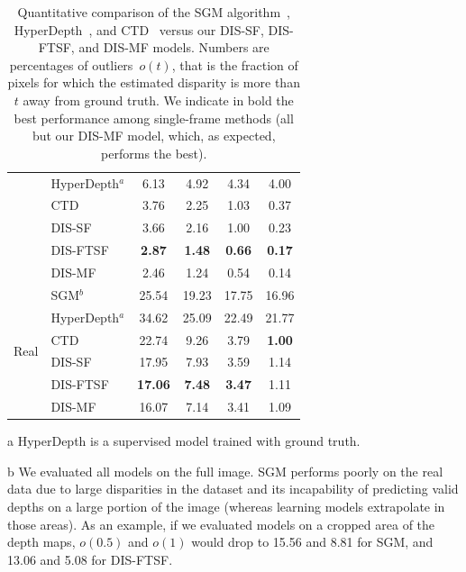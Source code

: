 \begin{table}[t]
\begin{center}
\begin{threeparttable}
\begin{tabular}{l|lcccc}
        & HyperDepth$^a$ & \phantom{0}6.13 & \phantom{0}4.92 & \phantom{0}4.34 & \phantom{0}4.00 \\
        & CTD & \phantom{0}3.76 & \phantom{0}2.25 & \phantom{0}1.03 & \phantom{0}0.37 \\
        & DIS-SF & \phantom{0}3.66 & \phantom{0}2.16 & \phantom{0}1.00 & \phantom{0}0.23 \\
        & DIS-FTSF & \phantom{0}\textbf{2.87} & \phantom{0}\textbf{1.48} & \phantom{0}\textbf{0.66} & \phantom{0}\textbf{0.17} \\ \arrayrulecolor{lightgray}\cline{2-6}\arrayrulecolor{black}
        & DIS-MF & \phantom{0}2.46 & \phantom{0}1.24 & \phantom{0}0.54 & \phantom{0}0.14 \\
        \hline
        \hline
        \multirow{6}{*}{\parbox{20ex}{Real}} & SGM$^b$ & 25.54 & 19.23 & 17.75 & 16.96 \\
        & HyperDepth$^a$ & 34.62 & 25.09 & 22.49 & 21.77 \\
        & CTD & 22.74 & \phantom{0}9.26 & \phantom{0}3.79 & \phantom{0}\textbf{1.00} \\
        & DIS-SF & 17.95 & \phantom{0}7.93 & \phantom{0}3.59 & \phantom{0}1.14 \\
        & DIS-FTSF & \textbf{17.06} & \phantom{0}\textbf{7.48} & \phantom{0}\textbf{3.47} & \phantom{0}1.11 \\ \arrayrulecolor{lightgray}\cline{2-6}\arrayrulecolor{black}
        & DIS-MF & 16.07 & \phantom{0}7.14 & \phantom{0}3.41 & \phantom{0}1.09 \\
        \hline
        \end{tabular}
        \begin{tablenotes}
        \item[a] HyperDepth is a supervised model trained with ground truth.
        \item[b] We evaluated all models on the full image. SGM performs poorly on the real data due to large disparities in the dataset and its incapability of predicting valid depths on a large portion of the image (whereas learning models extrapolate in those areas). As an example, if we evaluated models on a cropped area of the depth maps, $o(0.5)$ and $o(1)$ would drop to 15.56 and 8.81 for SGM, and 13.06 and 5.08 for DIS-FTSF.
        \end{tablenotes}   
      \end{threeparttable}
    \end{center}
    \caption{Quantitative comparison of the SGM algorithm~\cite{hirschmuller2007stereo}, HyperDepth~\cite{ryan2016hyperdepth}, and CTD~\cite{riegler2019connecting} versus our DIS-SF, DIS-FTSF, and DIS-MF models. Numbers are percentages of outliers~$o(t)$, that is the fraction of pixels for which the estimated disparity is more than $t$ away from ground truth. We indicate in bold the best performance among single-frame methods (\ie all but our DIS-MF model, which, as expected, performs the best).}
    \label{table:c2_quantitative}
\end{table}

